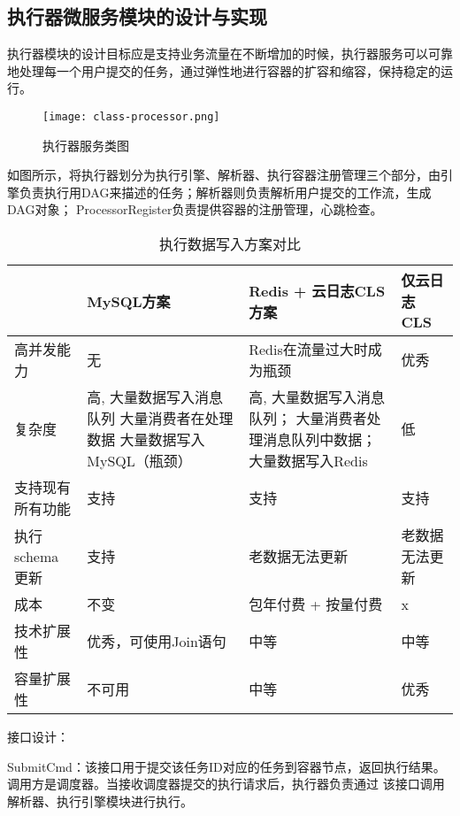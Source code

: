 \subsection{执行器微服务模块的设计与实现}

执行器模块的设计目标应是支持业务流量在不断增加的时候，执行器服务可以可靠地处理每一个用户提交的任务，通过弹性地进行容器的扩容和缩容，保持稳定的运行。

    \begin{figure}[H]
        \centering
        \texttt{[image: class-processor.png]}
        \caption{执行器服务类图}
        \label{fig:zxqfw}
    \end{figure}
    如图所示，将执行器划分为执行引擎、解析器、执行容器注册管理三个部分，由引擎负责执行用DAG来描述的任务；解析器则负责解析用户提交的工作流，生成DAG对象；
    ProcessorRegister负责提供容器的注册管理，心跳检查。


\begin{table}[H]
    \centering
    \caption{执行数据写入方案对比}
    \label{tab:design_1}
    \begin{tabular}{lp{12em}p{12em}l}
        \toprule
        & MySQL方案   & Redis + 云日志CLS方案          & 仅云日志CLS \\
        \midrule
        高并发能力 & 无 & Redis在流量过大时成为瓶颈 & 优秀\\
        复杂度 & 高, 大量数据写入消息队列
        大量消费者在处理数据
        大量数据写入MySQL（瓶颈）
        & 高, 大量数据写入消息队列；
        大量消费者处理消息队列中数据；
        大量数据写入Redis
        & 低\\
        支持现有所有功能 & 支持 & 支持 & 支持\\
        执行schema更新 & 支持 & 老数据无法更新 & 老数据无法更新\\
        成本 & 不变 & 包年付费 + 按量付费 & x\\
        技术扩展性 & 优秀，可使用Join语句 & 中等 & 中等\\
        容量扩展性 & 不可用 & 中等 & 优秀\\
        \bottomrule
    \end{tabular}
\end{table}

接口设计：

SubmitCmd：该接口用于提交该任务ID对应的任务到容器节点，返回执行结果。调用方是调度器。当接收调度器提交的执行请求后，执行器负责通过
该接口调用解析器、执行引擎模块进行执行。

